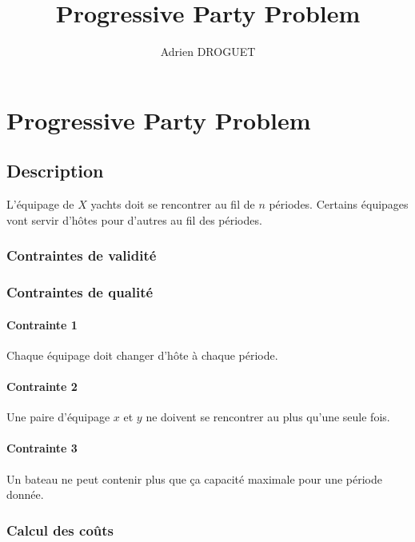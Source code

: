 \documentclass[a4paper,10pt]{report}
\title{Progressive Party Problem}
\author{Adrien DROGUET}
\begin{document}
\maketitle



\chapter{Progressive Party Problem}
\section{Description}
L'équipage de $X$ yachts doit se rencontrer au fil de $n$ périodes. Certains équipages
vont servir d'hôtes pour d'autres au fil des périodes.

\subsection{Contraintes de validité}


\subsection{Contraintes de qualité}
\subsubsection{Contrainte 1}
Chaque équipage doit changer d'hôte à chaque période.

\subsubsection{Contrainte 2}
Une paire d'équipage $x$ et $y$ ne doivent se rencontrer au plus qu'une seule fois.

\subsubsection{Contrainte 3}
Un bateau ne peut contenir plus que ça capacité maximale pour une période donnée.

\subsection{Calcul des coûts}
\end{document}
